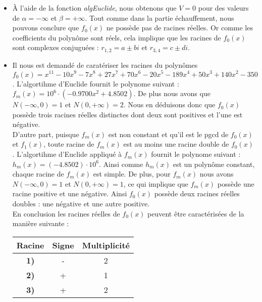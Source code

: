 \documentclass[11pt]{article}
\begin{document}
\begin{itemize}
  \item [\textbullet] À l'aide de la fonction \textit{algEuclide}, nous obtenons que $V=0$ pour des valeurs de $\alpha=-\infty$ et $\beta = + \infty$.
  Tout comme dans la partie échauffement, nous pouvons conclure que $f_{0}(x)$ ne possède pas de racines réelles. Or comme les coefficients du
  polynôme sont réels, cela implique que les racines de $f_{0}(x)$ sont complexes conjuguées : $r_{1,2}=a\pm bi$ et $r_{3,4}=c\pm di$.
  \item [\textbullet] Il nous est demandé de caratériser les racines du polynômes $f_0(x)=x^{11} −10x^9 −7x^8 +27x^7 +70x^6 −20x^5 −189x^4 +50x^3 +140x^2 −350$.
  L'algortihme d'Euclide fournit le polynome suivant : $f_{m}(x)=10^6\cdot(-0.9700x^2+4.8502)$. De plus nous avons que $N(-\infty, 0)=1$ et $N(0,+\infty)=2$. Nous en déduisons donc que $f_0 (x)$
  possède trois racines réelles distinctes dont deux sont positives et l'une est négative. \\

  D'autre part, puisque $f_m (x)$ est non constant et qu'il est le pgcd de $f_0 (x)$ et $f_1 (x)$, toute racine de $f_m (x)$ est au moins une racine double de $f_0 (x)$.
  L'algortihme d'Euclide appliqué à $f_m (x)$ fournit le polynome suivant : $h_{m}(x)=(-4.8502)\cdot10^6$. Ainsi comme $h_{m}(x)$ est un polynôme
  constant, chaque racine de $f_m (x)$ est simple. De plus, pour  $f_m (x)$  nous avons $N(-\infty, 0)=1$ et $N(0,+\infty)=1$, ce qui implique que  $f_m (x)$
  possède une racine positive et une négative. Ainsi $f_{0}(x)$ possède deux racines réelles doubles : une négative et une autre positive. \\

  En conclusion les racines réelles de $f_{0}(x)$ peuvent être caractérisées de la manière suivante :\\

  \begin{center}
    \begin{tabular}{|c||c|c|}
      \hline
      Racine&Signe&Multiplicité\\
      \hline
      \hline
      \textbf{1)}&-&2\\
      \hline
      \textbf{2)}&+&1\\
      \hline
      \textbf{3)}&+&2\\
      \hline
    \end{tabular}
  \end{center}
\end{itemize}
\end{document}

